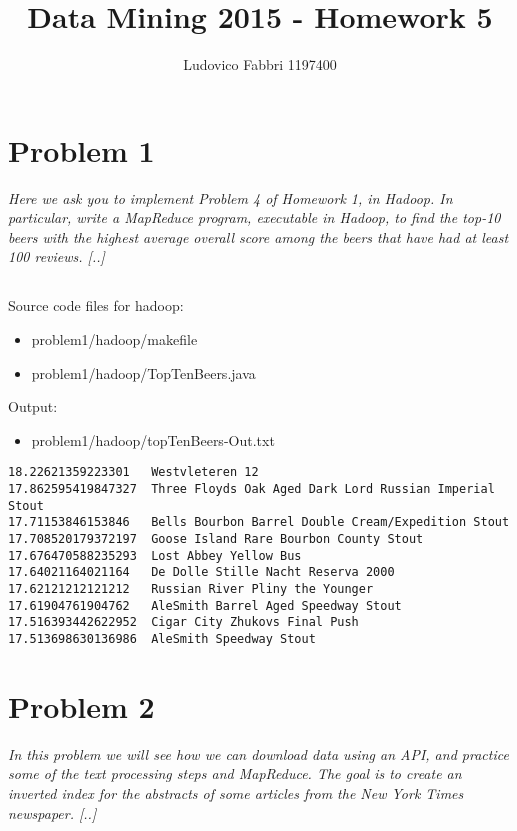 \documentclass{article}
\begin{document}
\raggedright

\doublespacing


\title{ {\Huge{Data Mining 2015 - Homework 5}} }
\author {Ludovico Fabbri 1197400}
\maketitle


\section{Problem 1}
\textit{Here we ask you to implement Problem 4 of Homework 1, in Hadoop. In particular, write a MapReduce program, executable in Hadoop, to find the top-10 beers with the highest average overall score among the beers that have had at least 100 reviews. [..]}


\subsection{}

Source code files for hadoop:
\begin {itemize}
    \item problem1/hadoop/makefile
    \item problem1/hadoop/TopTenBeers.java
\end {itemize}

Output:
\begin {itemize}
    \item problem1/hadoop/topTenBeers-Out.txt
\end {itemize}

\begin{lstlisting} 
18.22621359223301   Westvleteren 12 
17.862595419847327  Three Floyds Oak Aged Dark Lord Russian Imperial Stout 
17.71153846153846   Bells Bourbon Barrel Double Cream/Expedition Stout 
17.708520179372197  Goose Island Rare Bourbon County Stout 
17.676470588235293  Lost Abbey Yellow Bus  
17.64021164021164   De Dolle Stille Nacht Reserva 2000 
17.62121212121212   Russian River Pliny the Younger 
17.61904761904762   AleSmith Barrel Aged Speedway Stout 
17.516393442622952  Cigar City Zhukovs Final Push 
17.513698630136986  AleSmith Speedway Stout 
\end{lstlisting}










\section{Problem 2}
\textit{In this problem we will see how we can download data using an API, and practice some of the text processing steps and MapReduce. The goal is to create an inverted index for the abstracts of some articles from the New York Times newspaper. [..]}
\end{document}
